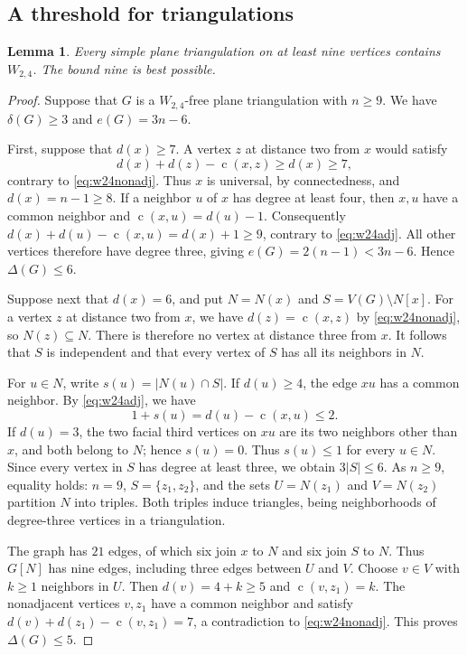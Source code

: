 \documentclass[11pt,a4paper]{article}
\newtheorem{lemma}[theorem]{Lemma}
\theoremstyle{remark}
\newcommand{\cdeg}{\operatorname{c}}
\begin{document}
\subsection{A threshold for triangulations}

\begin{lemma}\label{lem:w24tri}
Every simple plane triangulation on at least nine vertices contains
$W_{2,4}$. The bound nine is best possible.
\end{lemma}

\begin{proof}
Suppose that $G$ is a $W_{2,4}$-free plane triangulation with $n\geq9$.
We have $\delta(G)\geq3$ and $e(G)=3n-6$.

First, suppose that $d(x)\geq7$. A vertex $z$ at distance two from $x$
would satisfy
\[
 d(x)+d(z)-\cdeg(x,z)\geq d(x)\geq7,
\]
contrary to \eqref{eq:w24nonadj}. Thus $x$ is universal, by connectedness,
and $d(x)=n-1\geq8$. If a neighbor $u$ of $x$ has degree at least four,
then $x,u$ have a common neighbor and
$\cdeg(x,u)=d(u)-1$. Consequently
$d(x)+d(u)-\cdeg(x,u)=d(x)+1\geq9$, contrary to
\eqref{eq:w24adj}. All other vertices therefore have degree three,
giving $e(G)=2(n-1)<3n-6$. Hence $\Delta(G)\leq6$.

Suppose next that $d(x)=6$, and put $N=N(x)$ and
$S=V(G)\setminus N[x]$. For a vertex $z$ at distance two from $x$, we have
$d(z)=\cdeg(x,z)$ by \eqref{eq:w24nonadj}, so $N(z)\subseteq N$.
There is therefore no vertex at distance three from $x$. It follows
that $S$ is independent and that every vertex of $S$ has all its
neighbors in $N$.

For $u\in N$, write $s(u)=|N(u)\cap S|$. If $d(u)\geq4$, the edge $xu$
has a common neighbor. By \eqref{eq:w24adj}, we have
\[
 1+s(u)=d(u)-\cdeg(x,u)\leq2.
\]
If $d(u)=3$, the two facial third vertices on $xu$ are its two neighbors
other than $x$, and both belong to $N$; hence $s(u)=0$. Thus $s(u)\leq1$
for every $u\in N$. Since every vertex in $S$ has degree at least three,
we obtain $3|S|\leq6$. As $n\geq9$, equality holds: $n=9$,
$S=\{z_1,z_2\}$, and the sets $U=N(z_1)$ and $V=N(z_2)$ partition $N$
into triples. Both triples induce triangles, being neighborhoods of
degree-three vertices in a triangulation.

The graph has $21$ edges, of which six join $x$ to $N$ and six join $S$
to $N$. Thus $G[N]$ has nine edges, including three edges between $U$
and $V$. Choose $v\in V$ with $k\geq1$ neighbors in $U$. Then
$d(v)=4+k\geq5$ and $\cdeg(v,z_1)=k$. The nonadjacent vertices $v,z_1$
have a common neighbor and satisfy
$d(v)+d(z_1)-\cdeg(v,z_1)=7$, a contradiction to
\eqref{eq:w24nonadj}. This proves $\Delta(G)\leq5$.


\end{proof}
\end{document}
